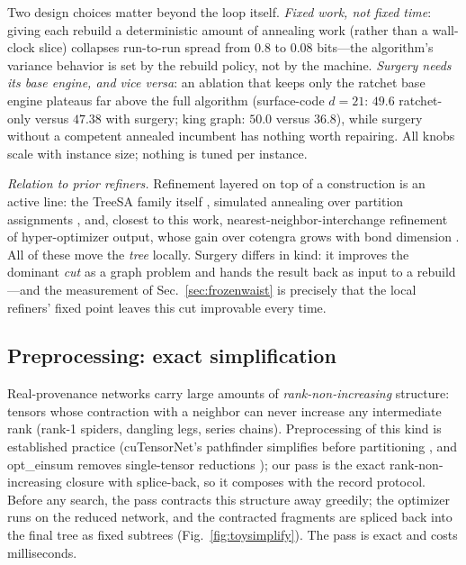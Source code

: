 \documentclass{SciPost}
\begin{document}
Two design choices matter beyond the loop itself. \emph{Fixed work, not
fixed time}: giving each rebuild a deterministic amount of annealing
work (rather than a wall-clock slice) collapses run-to-run spread from
$0.8$ to $0.08$ bits---the algorithm's variance behavior is set by the
rebuild policy, not by the machine. \emph{Surgery needs its base engine,
and vice versa}: an ablation that keeps only the ratchet base engine
plateaus far above the full algorithm (surface-code $d{=}21$: $49.6$
ratchet-only versus $47.38$ with surgery; king graph: $50.0$ versus
$36.8$), while surgery without a competent annealed incumbent has
nothing worth repairing. All knobs scale with instance size; nothing is
tuned per instance.

\emph{Relation to prior refiners.} Refinement layered on top of a
construction is an active line: the TreeSA family itself
\cite{kalachev_2021_multi}, simulated annealing over partition
assignments \cite{geiger_2025_optimizing}, and, closest to this work,
nearest-neighbor-interchange refinement of hyper-optimizer output,
whose gain over cotengra grows with bond dimension
\cite{guerrero_2026_bond}. All of these move the \emph{tree} locally.
Surgery differs in kind: it improves the dominant \emph{cut} as a
graph problem and hands the result back as input to a rebuild---and the
measurement of Sec.~\ref{sec:frozenwaist} is precisely that the local
refiners' fixed point leaves this cut improvable every time.

\subsection{Preprocessing: exact simplification}
\label{sec:simplify}

Real-provenance networks carry large amounts of
\emph{rank-non-increasing} structure: tensors whose contraction with a
neighbor can never increase any intermediate rank (rank-1 spiders,
dangling legs, series chains). Preprocessing of this kind is established practice
(cuTensorNet's pathfinder simplifies before partitioning
\cite{bayraktar_2023_cuquantum}, and opt\_einsum removes
single-tensor reductions \cite{smith_2018_opt}); our pass is the exact
rank-non-increasing closure with splice-back, so it composes with the
record protocol. Before any search, the pass contracts this structure
away greedily; the optimizer runs on the reduced network, and the
contracted fragments are spliced back into the final tree as fixed
subtrees (Fig.~\ref{fig:toysimplify}). The pass is exact and costs
milliseconds.
\end{document}
